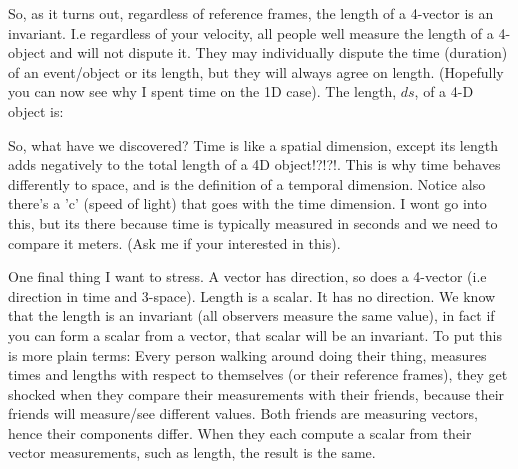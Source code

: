 So, as it turns out, regardless of reference frames, the length of a 4-vector is an invariant. I.e regardless of your velocity, all people well measure the length of a 4-object and will not dispute it. They may individually dispute the time (duration) of an event/object or its length, but they will always agree on length. (Hopefully you can now see why I spent time on the 1D case). The length, $ds$,  of a 4-D object is:


So, what have we discovered? Time is like a spatial dimension, except its length adds negatively to the total length of a 4D object!?!?!. This is why time behaves differently to space, and is the definition of a temporal dimension. Notice also there's a 'c' (speed of light) that goes with the time dimension. I wont go into this, but its there because time is typically measured in seconds and we need to compare it meters. (Ask me if your interested in this). 

One final thing I want to stress. A vector has direction, so does a 4-vector (i.e direction in time and 3-space). Length is a scalar. It has no direction. We know that the length is an invariant (all observers measure the same value), in fact if you can form a scalar from a vector, that scalar will be an invariant. To put this is more plain terms: Every person walking around doing their thing, measures times and lengths with respect to themselves (or their reference frames), they get shocked when they compare their measurements with their friends, because their friends will measure/see different values. Both friends are measuring vectors, hence their components differ. When they each compute a scalar from their vector measurements, such as length, the result is the same. 



